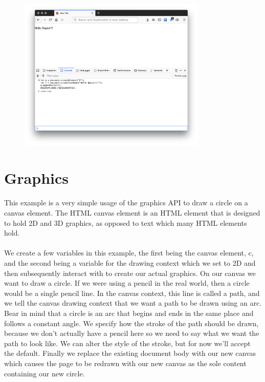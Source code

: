 \begin{figure}[H]
\centering
\includegraphics[width=0.8\textwidth]{figures/js-construct-page}
\label{fig:js-construct-page}
\caption{}
\end{figure}


\section{Graphics}
\paragraph{} This example is a very simple usage of the graphics API to draw a circle on a canvas element. The HTML canvas element is an HTML element that is designed to hold 2D and 3D graphics, as opposed to text which many HTML elements hold.
\paragraph{} We create a few variables in this example, the first being the canvas element, c, and the second being a variable for the drawing context which we set to 2D and then subsequently interact with to create our actual graphics. On our canvas we want to draw a circle. If we were using a pencil in the real world, then a circle would be a single pencil line. In the canvas context, this line is called a path, and we tell the canvas drawing context that we want a path to be drawn using an arc. Bear in mind that a circle is an arc that begins and ends in the same place and follows a constant angle. We specify how the stroke of the path should be drawn, because we don't actually have a pencil here so we need to say what we want the path to look like. We can alter the style of the stroke, but for now we'll accept the default. Finally we replace the existing document body with our new canvas which causes the page to be redrawn with our new canvas as the sole content containing our new circle.

